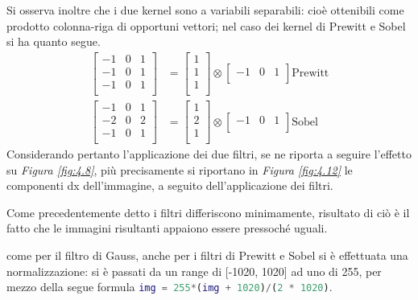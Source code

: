 \documentclass{subfiles}
\begin{document}
Si osserva inoltre che i due kernel sono a variabili separabili: cioè ottenibili come prodotto colonna-riga di opportuni vettori;
nel caso dei kernel di Prewitt e Sobel si ha quanto segue.
\[\begin{aligned}
        \begin{bmatrix}
            -1 & 0 & 1 \\
            -1 & 0 & 1 \\
            -1 & 0 & 1 \\
        \end{bmatrix} & = \begin{bmatrix}
                              1 \\
                              1 \\
                              1 \\
                          \end{bmatrix} \otimes \begin{bmatrix}
                                                    -1 & 0 & 1 \\
                                                \end{bmatrix} \text{Prewitt} \\
        \begin{bmatrix}
            -1 & 0 & 1 \\
            -2 & 0 & 2 \\
            -1 & 0 & 1 \\
        \end{bmatrix} & = \begin{bmatrix}
                              1 \\
                              2 \\
                              1 \\
                          \end{bmatrix} \otimes \begin{bmatrix}
                                                    -1 & 0 & 1 \\
                                                \end{bmatrix} \text{Sobel}
    \end{aligned}
\]
Considerando pertanto l'applicazione dei due filtri, se ne riporta a seguire l'effetto su \emph{Figura \ref{fig:4.8}},
più precisamente si riportano in \emph{Figura \ref{fig:4.12}} le componenti dx dell'immagine, a seguito dell'applicazione dei filtri.


Come precedentemente detto i filtri differiscono minimamente, risultato di ciò è il fatto che le immagini risultanti appaiono essere pressoché uguali.
\begin{Note*}
    come per il filtro di Gauss, anche per i filtri di Prewitt e Sobel si è effettuata una normalizzazione: si è passati da un range di [-1020, 1020] ad uno di 255,
    per mezzo della segue formula \lstinline[language = MATLAB]{img = 255*(img + 1020)/(2 * 1020)}.
\end{Note*}
\end{document}
